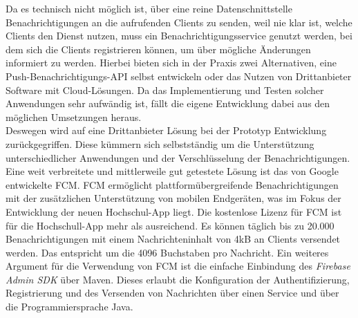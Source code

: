 Da es technisch nicht möglich ist, über eine reine Datenschnittstelle Benachrichtigungen an die aufrufenden Clients zu senden, weil nie klar ist, welche Clients den Dienst nutzen, muss ein Benachrichtigungsservice genutzt werden, bei dem sich die Clients registrieren können, um über mögliche Änderungen informiert zu werden. Hierbei bieten sich in der Praxis zwei Alternativen, eine  Push-Benachrichtigungs-\ac{API} selbst entwickeln oder das Nutzen von Drittanbieter Software mit Cloud-Lös\-ungen. Da das Implementierung und Testen solcher Anwendungen sehr aufwändig ist, fällt die eigene Entwicklung dabei aus den möglichen Umsetzungen heraus\autocite[][]{webpush}.
\\
\linebreak
Deswegen wird auf eine Drittanbieter Lösung bei der Prototyp Entwicklung zurückgegriffen. Diese kümmern sich selbstständig um die Unterstützung unterschiedlicher Anwendungen und der Verschlüsselung der Benachrichtigungen. Eine weit verbreitete und mittlerweile gut getestete Lösung ist das von Google entwickelte \ac{FCM}. \ac{FCM} ermöglicht plattformübergreifende Benachrichtigungen mit der zusätzlichen Unterstützung von mobilen Endgeräten, was im Fokus der Entwicklung der neuen Hochschul-\ac{App} liegt\autocite[][]{firebase_home}. Die kostenlose Lizenz für \ac{FCM} ist für die Hochschull-\ac{App} mehr als ausreichend. Es können täglich bis zu 20.000 Benachrichtigungen mit einem Nachrichteninhalt von 4\ac{kB} an Clients versendet werden. Das entspricht um die 4096 Buchstaben pro Nachricht. Ein weiteres Argument für die Verwendung von \ac{FCM} ist die einfache Einbindung des \textit{Firebase Admin \ac{SDK}} über Maven. Dieses erlaubt die Konfiguration der Authentifizierung, Registrierung und des Versenden von Nachrichten über einen Service und über die Programmiersprache Java.
